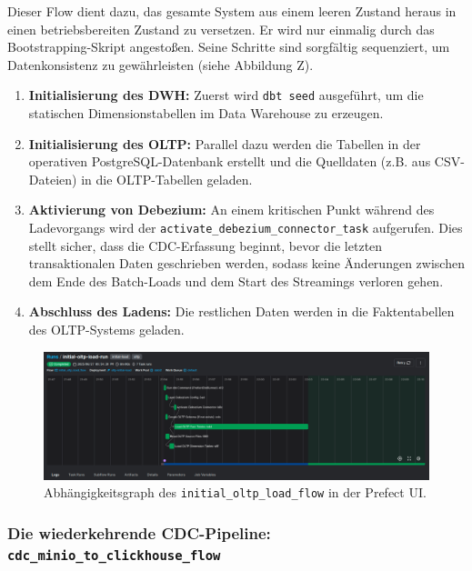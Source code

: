 \documentclass[
    12pt,               
    a4paper,        
    ngerman            
]{scrartcl}
\begin{document}
Dieser Flow dient dazu, das gesamte System aus einem leeren Zustand heraus in einen betriebsbereiten Zustand zu versetzen. Er wird nur einmalig durch das Bootstrapping-Skript angestoßen. Seine Schritte sind sorgfältig sequenziert, um Datenkonsistenz zu gewährleisten (siehe Abbildung Z). %
\begin{enumerate}
    \item \textbf{Initialisierung des DWH:} Zuerst wird \texttt{dbt seed} ausgeführt, um die statischen Dimensionstabellen im Data Warehouse zu erzeugen.
    
    \item \textbf{Initialisierung des OLTP:} Parallel dazu werden die Tabellen in der operativen PostgreSQL-Datenbank erstellt und die Quelldaten (z.B. aus CSV-Dateien) in die OLTP-Tabellen geladen.
    
    \item \textbf{Aktivierung von Debezium:} An einem kritischen Punkt während des Ladevorgangs wird der \texttt{activate\_debezium\_connector\_task} aufgerufen. Dies stellt sicher, dass die CDC-Erfassung beginnt, bevor die letzten transaktionalen Daten geschrieben werden, sodass keine Änderungen zwischen dem Ende des Batch-Loads und dem Start des Streamings verloren gehen.
    
    \item \textbf{Abschluss des Ladens:} Die restlichen Daten werden in die Faktentabellen des OLTP-Systems geladen.
\end{enumerate}

\begin{figure}[h!]
    \centering
    \includegraphics[width=\textwidth]{initial-flow.png} %
    \caption{Abhängigkeitsgraph des \texttt{initial\_oltp\_load\_flow} in der Prefect UI.}
    \label{fig:setup_flow}
\end{figure}

\subsubsection{Die wiederkehrende CDC-Pipeline: \texttt{cdc\_minio\_to\_clickhouse\_flow}}
\label{subsec:prefect_cdc_clickhouse_flow}
\end{document}
